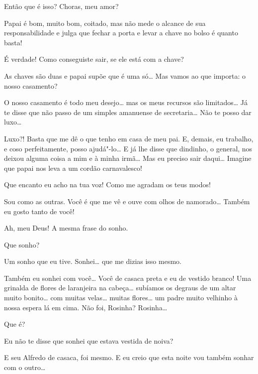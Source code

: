 \begin{linenumbers}
 Então que é isso? Choras, meu amor?

 Papai é
bom, muito bom, coitado, mas não mede o
alcance de sua responsabilidade e julga que fechar a porta e
levar a chave no bolso é quanto basta!

 É verdade! Como
conseguiste sair, se ele está com a chave?

 As chaves
são duas e papai supõe que
é uma só\ldots{}  Mas
vamos ao que importa: o nosso casamento?

 O nosso casamento
é todo meu desejo\ldots{} 
mas os meus recursos são limitados\ldots{} Já te
disse que não passo de um simples amanuense de
secretaria\ldots{} Não te posso dar luxo\ldots{}

 Luxo?! Basta que
me dê o que tenho em casa de meu pai. E, demais, eu
trabalho, e coso perfeitamente, posso ajudá"-lo\ldots{} E já
lhe disse que dindinho, o general, nos deixou alguma coisa a
mim e à minha irmã\ldots{} Mas eu
preciso sair daqui\ldots{} Imagine que papai nos leva a um cordão
carnavalesco!

 Que encanto eu
acho na tua voz! Como me agradam os teus modos!

 Sou como as
outras. Você é que me vê e ouve com
olhos de namorado\ldots{} Também eu gosto tanto de
você!

 Ah, meu Deus! A
mesma frase do sonho.

 Que sonho?

 Um sonho que eu
tive. Sonhei\ldots{} que me dizias isso mesmo.

 Também eu sonhei
com você\ldots{} Você de casaca preta e eu de vestido
branco! Uma grinalda de flores de laranjeira na cabeça\ldots{} 
subíamos os degraus de um altar muito bonito\ldots{} com muitas
velas\ldots{} muitas flores\ldots{} um padre muito velhinho à
nossa espera lá em cima.  Não foi, Rosinha?
 Rosinha\ldots{}

   Que é?

 Eu não te disse que sonhei que estava vestida de noiva?

 E seu Alfredo de
casaca, foi mesmo. E eu creio que esta noite vou também
sonhar com o outro\ldots{}


\end{linenumbers}
